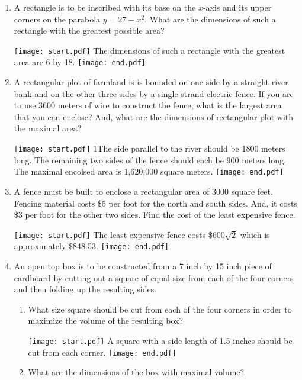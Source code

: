 \documentclass[12pt]{article}
\begin{document}
\begin{enumerate}

\item A rectangle is to be inscribed with its base on the $x$-axis and its upper corners on the parabola $y=27-x^2$.  What are the dimensions of such a rectangle with the greatest possible area?

\texttt{[image: start.pdf]}
{{The dimensions of such a rectangle with the greatest area are 6 by 18.}}
\texttt{[image: end.pdf]}


\item A rectangular plot of farmland is is bounded on one side by a straight river bank and on the other three sides by a single-strand electric fence.  If you are to use 3600 meters of wire to construct the fence, what is the largest area that you can enclose?  And, what are the dimensions of rectangular plot with the maximal area?

\texttt{[image: start.pdf]}
{{{1\linewidth}{The side parallel to the river should be 1800 meters long.  The remaining two sides of the fence should each be 900 meters long.  The maximal encolsed area is 1,620,000 square meters.}}}
\texttt{[image: end.pdf]}


\item A fence must be built to enclose a rectangular area of 3000 square feet.  Fencing material costs \$5 per foot for the north and south sides.  And, it costs \$3 per foot for the other two sides.  Find the cost of the least expensive fence.

\texttt{[image: start.pdf]}
{{The least expensive fence costs \$$600\sqrt{2}$ which is approximately \$848.53.}}
\texttt{[image: end.pdf]}


\item An open top box is to be constructed from a 7 inch by 15 inch piece of cardboard by cutting out a square of equal size from each of the four corners and then folding up the resulting sides.

\begin{enumerate}

\item What size square should be cut from each of the four corners in order to maximize the volume of the resulting box?

\texttt{[image: start.pdf]}
{{A square with a side length of 1.5 inches should be cut from each corner.}}
\texttt{[image: end.pdf]}


\item What are the dimensions of the box with maximal volume?


\end{enumerate}
\end{enumerate}
\end{document}
